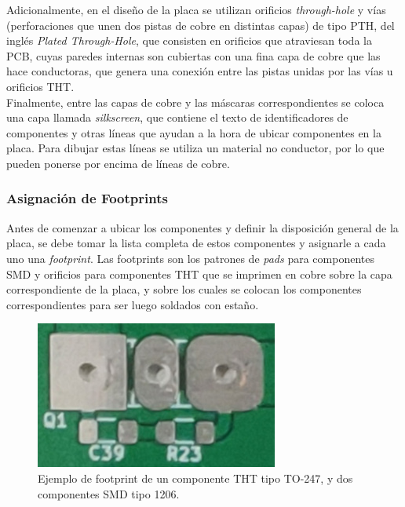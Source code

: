 Adicionalmente, en el diseño de la placa se utilizan orificios \textit{through-hole} y vías (perforaciones que unen dos pistas de cobre en distintas capas) de tipo {\Medium PTH}, del inglés \textit{Plated Through-Hole}, que consisten en orificios que atraviesan toda la PCB, cuyas paredes internas son cubiertas con una fina capa de cobre que las hace conductoras, que genera una conexión entre las pistas unidas por las vías u orificios THT.\\

Finalmente, entre las capas de cobre y las máscaras correspondientes se coloca una capa llamada {\Medium\textit{silkscreen}}, que contiene el texto de identificadores de componentes y otras líneas que ayudan a la hora de ubicar componentes en la placa. Para dibujar estas líneas se utiliza un material no conductor, por lo que pueden ponerse por encima de líneas de cobre.\\

\subsubsection{Asignación de Footprints}

Antes de comenzar a ubicar los componentes y definir la disposición general de la placa, se debe tomar la lista completa de estos componentes y asignarle a cada uno una \textit{footprint}. Las footprints son los patrones de \textit{pads} para componentes SMD y orificios para componentes THT que se imprimen en cobre sobre la capa correspondiente de la placa, y sobre los cuales se colocan los componentes correspondientes para ser luego soldados con estaño.\\

\begin{figure}[h]
    \centering
    \includegraphics[scale=0.4]{Imagenes/Ejemplo Footprint.jpg}
    \caption{Ejemplo de footprint de un componente THT tipo TO-247, y dos componentes SMD tipo 1206.}
    \label{footprints}
\end{figure}

